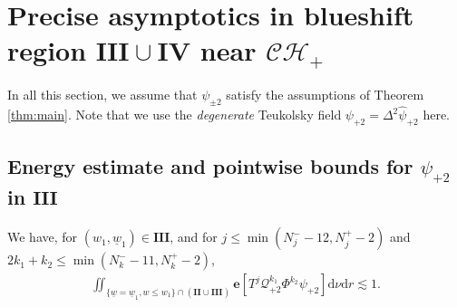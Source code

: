 \documentclass[reqno]{amsart}
\numberwithin{equation}{section}
\newcommand{\quatre}{\mathbf{IV}}
\newcommand{\mcq}{\mathcal{Q}}
\newcommand{\wbar}{\underline{w}}
\newcommand{\dee}{\mathrm{d}}
\newcommand{\ch}{\mathcal{CH_+}}
\newcommand{\ener}{\mathbf{e}}
\newcommand{\Psihat}{\widehat{\psi}}
\newcommand{\deux}{\mathbf{II}}
\newcommand{\trois}{\mathbf{III}}
\newcommand{\psip}{\psi_{+2}}
\newcommand{\Psihatp}{\Psihat_{+2}}
\theoremstyle{plain}
\theoremstyle{definition}
\theoremstyle{remark}
\numberwithin{equation}{section}
\begin{document}
\section{Precise asymptotics in blueshift region $\mathbf{III}\cup\quatre$ near $\ch$}\label{section:blueshiftIII}
In all this section, we assume that $\psi_{\pm 2}$ satisfy the assumptions of Theorem \ref{thm:main}. Note that we use the \emph{degenerate} Teukolsky field $\psi_{+ 2}=\Delta^2\Psihatp$ here.
\subsection{Energy estimate and pointwise bounds for $\psip$ in $\trois$}\label{subsection:boundedener}
\begin{prop}\label{prop:enerborne}
We have, for $(w_1,\wbar_1)\in\trois$, and for $j\leq \min(N_j^--12,N_j^+-2)$ and $2k_1+k_2\leq \min(N_k^--11,N_k^+-2)$, 
\begin{align*}
        \iint_{\{\wbar=\wbar_1, w\leq w_1\}\cap(\deux\cup\trois)}\ener[T^j\mcq_{+2}^{k_1}\Phi^{k_2}\psip]\dee\nu\dee r\lesssim 1.
\end{align*}
\end{prop}
\end{document}
